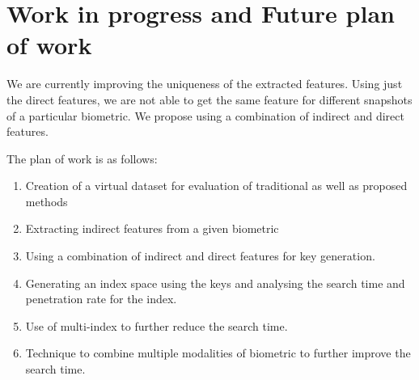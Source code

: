 \section{Work in progress and Future plan of work}
\label{work_in_prog}
We are currently improving the uniqueness of the extracted features. Using just the direct features, we are not able to get the same feature for different snapshots of a particular biometric. We propose using a combination of indirect and direct features.

The plan of work is as follows:

\begin{enumerate}
    \item Creation of a virtual dataset for evaluation of traditional as well as proposed methods
    \item Extracting indirect features from a given biometric
    \item Using a combination of indirect and direct features for key generation.
    \item Generating an index space using the keys and analysing the search time and penetration rate for the index.
    \item Use of multi-index to further reduce the search time.
    \item Technique to combine multiple modalities of biometric to further improve the search time.
\end{enumerate}